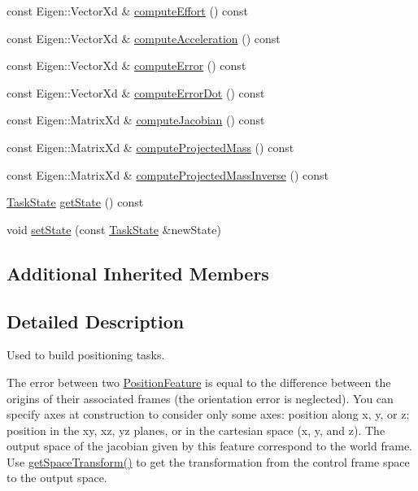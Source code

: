 \begin{DoxyCompactItemize}
\item 
const Eigen\+::\+Vector\+Xd \& \hyperlink{classocra_1_1PositionFeature_a31fda0cc674bf08b067c12af39c5fbdd}{compute\+Effort} () const
\item 
const Eigen\+::\+Vector\+Xd \& \hyperlink{classocra_1_1PositionFeature_ad8cc562d88824f58ee21a1b1476edd4b}{compute\+Acceleration} () const
\item 
const Eigen\+::\+Vector\+Xd \& \hyperlink{classocra_1_1PositionFeature_a5f89935f4b2f1b420e1dec19ed6692b5}{compute\+Error} () const
\item 
const Eigen\+::\+Vector\+Xd \& \hyperlink{classocra_1_1PositionFeature_a3bf7b70beb60e5e2a4975a157f7b6c19}{compute\+Error\+Dot} () const
\item 
const Eigen\+::\+Matrix\+Xd \& \hyperlink{classocra_1_1PositionFeature_a15ec85661a0c18620f9214a375066cdd}{compute\+Jacobian} () const
\item 
const Eigen\+::\+Matrix\+Xd \& \hyperlink{classocra_1_1PositionFeature_aed6469ba39dae7d5ed76ee6f78ee8b5e}{compute\+Projected\+Mass} () const
\item 
const Eigen\+::\+Matrix\+Xd \& \hyperlink{classocra_1_1PositionFeature_a376ba3d167f5937ce97ccec0a27e2adf}{compute\+Projected\+Mass\+Inverse} () const
\item 
\hyperlink{classocra_1_1TaskState}{Task\+State} \hyperlink{classocra_1_1PositionFeature_a4727a1538487e8194789bc8d38807ea0}{get\+State} () const
\item 
void \hyperlink{classocra_1_1PositionFeature_a59ca48f39003aeba08dd8a6e8eec686c}{set\+State} (const \hyperlink{classocra_1_1TaskState}{Task\+State} \&new\+State)
\end{DoxyCompactItemize}
\subsection*{Additional Inherited Members}


\subsection{Detailed Description}
Used to build positioning tasks. 

The error between two \hyperlink{classocra_1_1PositionFeature}{Position\+Feature} is equal to the difference between the origins of their associated frames (the orientation error is neglected). You can specify axes at construction to consider only some axes\+: position along x, y, or z; position in the xy, xz, yz planes, or in the cartesian space (x, y, and z). The output space of the jacobian given by this feature correspond to the world frame. Use \hyperlink{classocra_1_1PositionFeature_a5ac98c0865a46c55d30fd7ab9738245c}{get\+Space\+Transform()} to get the transformation from the control frame space to the output space. 

